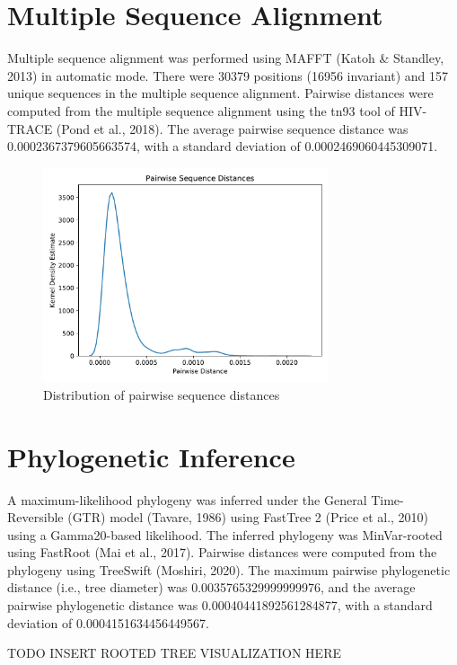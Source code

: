 \documentclass{article}
\begin{document}
\section{Multiple Sequence Alignment}
Multiple sequence alignment was performed using MAFFT (Katoh \& Standley, 2013) in automatic mode.
There were 30379 positions (16956 invariant) and 157 unique sequences in the multiple sequence alignment.
Pairwise distances were computed from the multiple sequence alignment using the tn93 tool of HIV-TRACE (Pond et al., 2018).
The average pairwise sequence distance was 0.0002367379605663574,
with a standard deviation of 0.0002469060445309071.


\begin{figure}[h]
\centering
\includegraphics[width=0.75\textwidth]{./figs/pairwise_distances_sequences.pdf}
\caption{Distribution of pairwise sequence distances}
\end{figure}

\section{Phylogenetic Inference}
A maximum-likelihood phylogeny was inferred under the General Time-Reversible (GTR) model (Tavare, 1986) using FastTree 2 (Price et al., 2010) using a Gamma20-based likelihood.
The inferred phylogeny was MinVar-rooted using FastRoot (Mai et al., 2017).
Pairwise distances were computed from the phylogeny using TreeSwift (Moshiri, 2020).
The maximum pairwise phylogenetic distance (i.e., tree diameter) was 0.0035765329999999976,
and the average pairwise phylogenetic distance was 0.00040441892561284877,
with a standard deviation of 0.0004151634456449567.


TODO INSERT ROOTED TREE VISUALIZATION HERE
\end{document}
